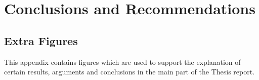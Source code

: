 \documentclass[print]{tudelft-report}
\begin{document}
\part{Conclusions and Recommendations}



% 
%
\printbibliography[heading=bibintoc]

\begin{appendices}
  
  
  \chapter{Extra Figures}
  This appendix contains figures which are used to support the explanation of certain results, arguments and conclusions in the main part of the Thesis report.
    \begin{figure}[htb]
    \centering
    \captionsetup{justification=centering}


\end{figure}
\end{appendices}
\end{document}
